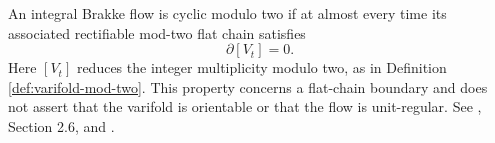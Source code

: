 \begin{definition}\label{def:cyclic-brakke}
An integral Brakke flow is cyclic modulo two if at almost every time its associated rectifiable mod-two flat chain satisfies
\[
 \partial[V_t]=0.
\]
Here $[V_t]$ reduces the integer multiplicity modulo two, as in Definition \ref{def:varifold-mod-two}. This property concerns a flat-chain boundary and does not assert that the varifold is orientable or that the flow is unit-regular. See \cite{CCMS20}, Section 2.6, and \cite{White09}.
\end{definition}

